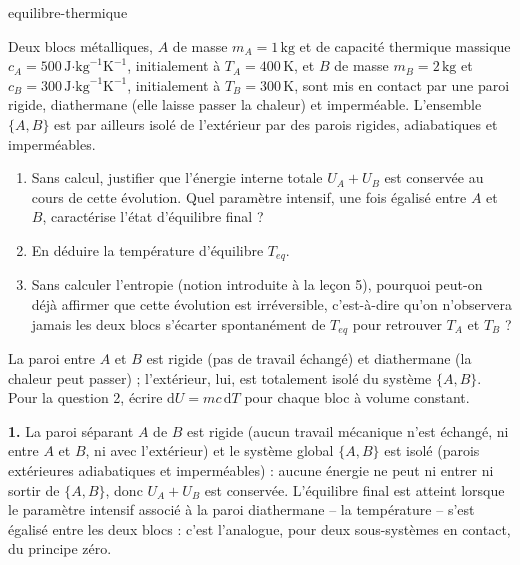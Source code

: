 
\begin{exo}{equilibre-thermique}

Deux blocs métalliques, $A$ de masse $m_A = 1\,\text{kg}$ et de capacité thermique massique $c_A = 500\,\text{J·kg}^{-1}\text{K}^{-1}$, initialement à $T_A = 400\,\text{K}$, et $B$ de masse $m_B = 2\,\text{kg}$ et $c_B = 300\,\text{J·kg}^{-1}\text{K}^{-1}$, initialement à $T_B = 300\,\text{K}$, sont mis en contact par une paroi rigide, diathermane (elle laisse passer la chaleur) et imperméable. L'ensemble $\{A, B\}$ est par ailleurs isolé de l'extérieur par des parois rigides, adiabatiques et imperméables.

\begin{enumerate}
  \item Sans calcul, justifier que l'énergie interne totale $U_A + U_B$ est conservée au cours de cette évolution. Quel paramètre intensif, une fois égalisé entre $A$ et $B$, caractérise l'état d'équilibre final ?
  \item En déduire la température d'équilibre $T_{eq}$.
  \item Sans calculer l'entropie (notion introduite à la leçon 5), pourquoi peut-on déjà affirmer que cette évolution est irréversible, c'est-à-dire qu'on n'observera jamais les deux blocs s'écarter spontanément de $T_{eq}$ pour retrouver $T_A$ et $T_B$ ?
\end{enumerate}

\begin{indication}
La paroi entre $A$ et $B$ est rigide (pas de travail échangé) et diathermane (la chaleur peut passer) ; l'extérieur, lui, est totalement isolé du système $\{A,B\}$. Pour la question 2, écrire $\mathrm{d}U = mc\,\mathrm{d}T$ pour chaque bloc à volume constant.
\end{indication}

\begin{solution}
\textbf{1.} La paroi séparant $A$ de $B$ est rigide (aucun travail mécanique n'est échangé, ni entre $A$ et $B$, ni avec l'extérieur) et le système global $\{A,B\}$ est isolé (parois extérieures adiabatiques et imperméables) : aucune énergie ne peut ni entrer ni sortir de $\{A,B\}$, donc $U_A + U_B$ est conservée. L'équilibre final est atteint lorsque le paramètre intensif associé à la paroi diathermane -- la température -- s'est égalisé entre les deux blocs : c'est l'analogue, pour deux sous-systèmes en contact, du principe zéro.


\end{solution}
\end{exo}

